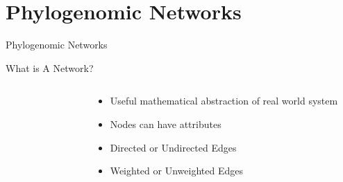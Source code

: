 \documentclass[dvipsnames]{beamer}
\begin{document}
\section{Phylogenomic Networks}
\begin{frame}{}
    \begin{center}
        \Huge \textcolor{OliveGreen}{Phylogenomic Networks}
    \end{center}
\end{frame}
\begin{frame}[fragile]{What is A Network?}
\begin{columns}
    \begin{column}{0.5\textwidth}
        \begin{figure}[htb!]
        \end{figure}
        \autocite{bondy}
    \end{column}
    \begin{column}{0.5\textwidth}
        \begin{itemize}
            \item<2-> Useful mathematical abstraction of real world system
            \item<3-> Nodes can have attributes
            \item<4-> Directed or Undirected Edges
            \item<5-> Weighted or Unweighted Edges
        \end{itemize}
    \end{column}
\end{columns}
\end{frame}
\end{document}
